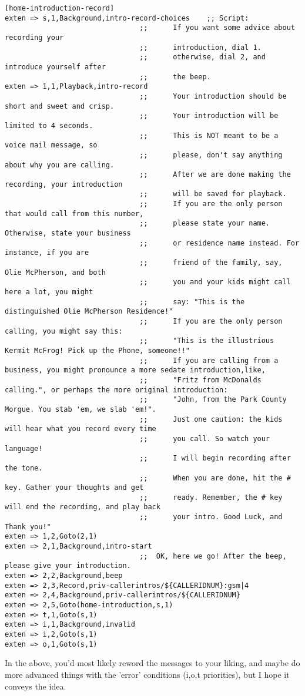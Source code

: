 \begin{verbatim}
[home-introduction-record]
exten => s,1,Background,intro-record-choices    ;; Script:
                                ;;      If you want some advice about recording your
                                ;;      introduction, dial 1. 
                                ;;      otherwise, dial 2, and introduce yourself after
                                ;;      the beep.
exten => 1,1,Playback,intro-record
                                ;;      Your introduction should be short and sweet and crisp.
                                ;;      Your introduction will be limited to 4 seconds.
                                ;;      This is NOT meant to be a voice mail message, so
                                ;;      please, don't say anything about why you are calling.
                                ;;      After we are done making the recording, your introduction
                                ;;      will be saved for playback. 
                                ;;      If you are the only person that would call from this number, 
                                ;;      please state your name.  Otherwise, state your business
                                ;;      or residence name instead. For instance, if you are 
                                ;;      friend of the family, say, Olie McPherson, and both
                                ;;      you and your kids might call here a lot, you might
                                ;;      say: "This is the distinguished Olie McPherson Residence!"
                                ;;      If you are the only person calling, you might say this:
                                ;;      "This is the illustrious Kermit McFrog! Pick up the Phone, someone!!"
                                ;;      If you are calling from a business, you might pronounce a more sedate introduction,like,
                                ;;      "Fritz from McDonalds calling.", or perhaps the more original introduction:
                                ;;      "John, from the Park County Morgue. You stab 'em, we slab 'em!".
                                ;;      Just one caution: the kids will hear what you record every time
                                ;;      you call. So watch your language!
                                ;;      I will begin recording after the tone. 
                                ;;      When you are done, hit the # key. Gather your thoughts and get 
                                ;;      ready. Remember, the # key will end the recording, and play back
                                ;;      your intro. Good Luck, and Thank you!"
exten => 1,2,Goto(2,1)
exten => 2,1,Background,intro-start
                                ;;  OK, here we go! After the beep, please give your introduction.
exten => 2,2,Background,beep
exten => 2,3,Record,priv-callerintros/${CALLERIDNUM}:gsm|4
exten => 2,4,Background,priv-callerintros/${CALLERIDNUM}
exten => 2,5,Goto(home-introduction,s,1)
exten => t,1,Goto(s,1)
exten => i,1,Background,invalid
exten => i,2,Goto(s,1)
exten => o,1,Goto(s,1)
\end{verbatim}

In the above, you'd most likely reword the messages to your liking,
and maybe do more advanced things with the 'error' conditions (i,o,t priorities),
but I hope it conveys the idea.


